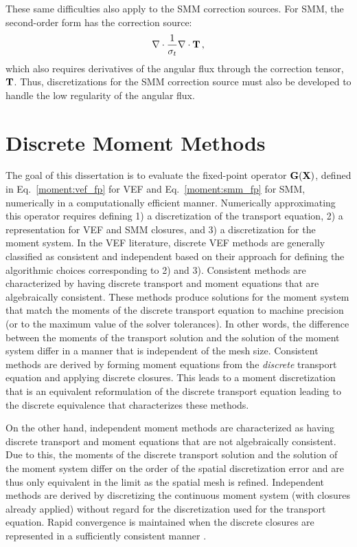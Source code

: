 \documentclass[../doc.tex]{subfiles}
\begin{document}
These same difficulties also apply to the SMM correction sources. For SMM, the second-order form has the correction source: 
	\begin{equation}
		\nabla\cdot\frac{1}{\sigma_t}\nabla\cdot\boldsymbol{\mathrm{T}} \,, 
	\end{equation}
which also requires derivatives of the angular flux through the correction tensor, $\boldsymbol{\mathrm{T}}$. Thus, discretizations for the SMM correction source must also be developed to handle the low regularity of the angular flux. 

\section{Discrete Moment Methods}
The goal of this dissertation is to evaluate the fixed-point operator $\boldsymbol{\mathrm{G}}(\boldsymbol{\mathrm{X}})$, defined in Eq.~\ref{moment:vef_fp} for VEF and Eq.~\ref{moment:smm_fp} for SMM, numerically in a computationally efficient manner. Numerically approximating this operator requires defining 1) a discretization of the transport equation, 2) a representation for VEF and SMM closures, and 3) a discretization for the moment system. In the VEF literature, discrete VEF methods are generally classified as consistent and independent based on their approach for defining the algorithmic choices corresponding to 2) and 3). Consistent methods are characterized by having discrete transport and moment equations that are algebraically consistent. These methods produce solutions for the moment system that match the moments of the discrete transport equation to machine precision (or to the maximum value of the solver tolerances). In other words, the difference between the moments of the transport solution and the solution of the moment system differ in a manner that is independent of the mesh size. Consistent methods are derived by forming moment equations from the \emph{discrete} transport equation and applying discrete closures. This leads to a moment discretization that is an equivalent reformulation of the discrete transport equation leading to the discrete equivalence that characterizes these methods. 

On the other hand, independent moment methods are characterized as having discrete transport and moment equations that are not algebraically consistent. Due to this, the moments of the discrete transport solution and the solution of the moment system differ on the order of the spatial discretization error and are thus only equivalent in the limit as the spatial mesh is refined. 
Independent methods are derived by discretizing the continuous moment system (with closures already applied) without regard for the discretization used for the transport equation. Rapid convergence is maintained when the discrete closures are represented in a sufficiently consistent manner \cite{two-level-independent-warsa}. 
\end{document}
